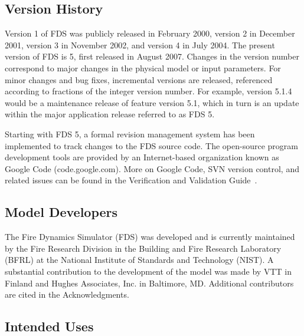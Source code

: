 \documentclass[11pt]{book}
\begin{document}
\subsection{Version History}

Version 1 of FDS was publicly released in February 2000, version 2
in December 2001, version 3 in November 2002, and version 4 in July 2004.
The present version of FDS is 5, first released in August 2007. Changes in
the version number correspond to major changes in the physical model
or input parameters. For minor changes and bug fixes, incremental
versions are released, referenced according to fractions of the integer
version number. For example, version 5.1.4 would be a maintenance release of feature
version 5.1, which in turn is an update within the major application release referred to as FDS 5.

Starting with FDS 5, a formal revision management system has been implemented to track changes to the FDS source
code. The open-source program development tools are provided by an Internet-based organization known as Google Code (code.google.com).
More on Google Code, SVN version control, and related issues can be found in the Verification and Validation Guide~\cite{FDS_VV_Guide_5}.


\subsection{Model Developers}

The Fire Dynamics Simulator (FDS) was developed and is currently
maintained by the Fire Research Division in the Building and Fire
Research Laboratory (BFRL) at the National Institute of Standards and
Technology (NIST).  A substantial contribution to the development of
the model was made by VTT in Finland and Hughes Associates, Inc. in
Baltimore, MD. Additional contributors are cited in the
Acknowledgments.


\subsection{Intended Uses}
\end{document}
